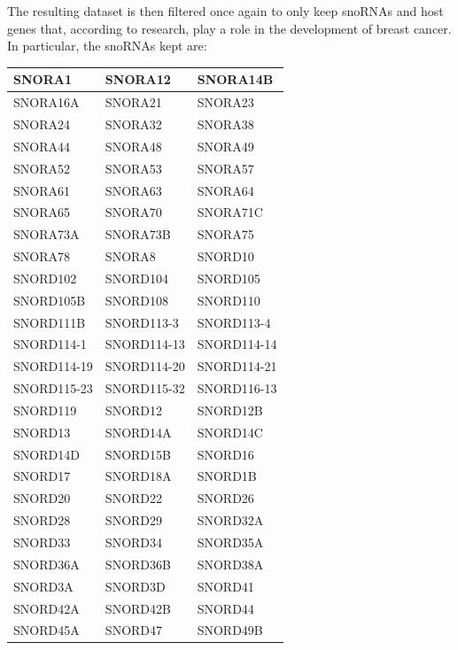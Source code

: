 \documentclass[journal]{IEEEtran}
\begin{document}
The resulting dataset is then filtered once again to only keep snoRNAs and host genes that, according to research, play a role in the development of breast cancer. In particular, the snoRNAs kept are:
\begin{table}[h!]
    \centering
    \begin{tabularx}{\linewidth}{| X | X | X |}
        \hline
        SNORA1 & SNORA12 & SNORA14B \\ \hline
        SNORA16A & SNORA21 & SNORA23 \\ \hline
        SNORA24 & SNORA32 & SNORA38 \\ \hline
        SNORA44 & SNORA48 & SNORA49 \\ \hline
        SNORA52 & SNORA53 & SNORA57 \\ \hline
        SNORA61 & SNORA63 & SNORA64 \\ \hline
        SNORA65 & SNORA70 & SNORA71C \\ \hline
        SNORA73A & SNORA73B & SNORA75 \\ \hline
        SNORA78 & SNORA8 & SNORD10 \\ \hline
        SNORD102 & SNORD104 & SNORD105 \\ \hline
        SNORD105B & SNORD108 & SNORD110 \\ \hline
        SNORD111B & SNORD113-3 & SNORD113-4 \\ \hline
        SNORD114-1 & SNORD114-13 & SNORD114-14 \\ \hline
        SNORD114-19 & SNORD114-20 & SNORD114-21 \\ \hline
        SNORD115-23 & SNORD115-32 & SNORD116-13 \\ \hline
        SNORD119 & SNORD12 & SNORD12B \\ \hline
        SNORD13 & SNORD14A & SNORD14C \\ \hline
        SNORD14D & SNORD15B & SNORD16 \\ \hline
        SNORD17 & SNORD18A & SNORD1B \\ \hline
        SNORD20 & SNORD22 & SNORD26 \\ \hline
        SNORD28 & SNORD29 & SNORD32A \\ \hline
        SNORD33 & SNORD34 & SNORD35A \\ \hline
        SNORD36A & SNORD36B & SNORD38A \\ \hline
        SNORD3A & SNORD3D & SNORD41 \\ \hline
        SNORD42A & SNORD42B & SNORD44 \\ \hline
        SNORD45A & SNORD47 & SNORD49B \\ \hline

\end{tabularx}
\end{table}
\end{document}
